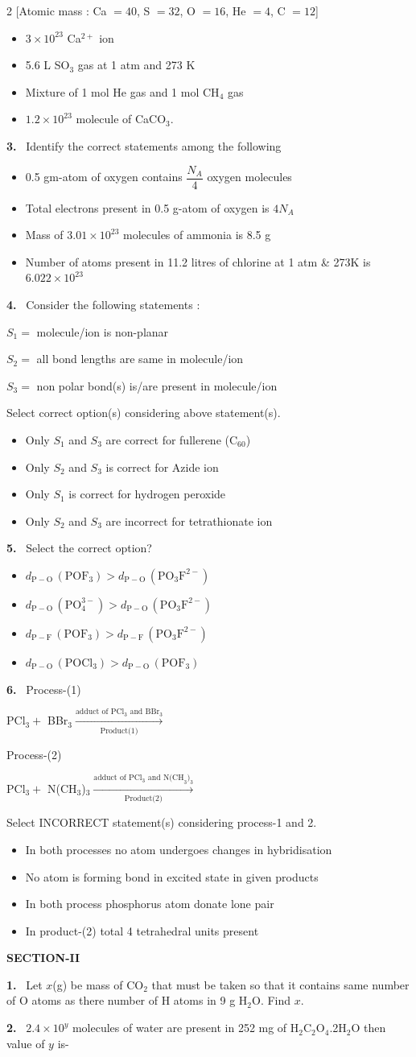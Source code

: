 \documentclass[10pt]{extarticle}
\newcommand{\sect}[1]{\par\smallskip\noindent\textbf{#1}\par}
\newcommand{\qn}[1]{\par\smallskip\noindent\textbf{#1.}~}
\newenvironment{qoptions}{\begin{itemize}[leftmargin=1.8em,itemsep=1pt,topsep=2pt,label={}]}{\end{itemize}}
\newcommand{\opt}[2]{\item[(#1)] #2}
\begin{document}
\begin{multicols}{2}
[Atomic mass : Ca $=40$, S $=32$, O $=16$, He $=4$, C $=12$]
\begin{qoptions}
\opt{A}{$3\times10^{23}$ Ca$^{2+}$ ion}
\opt{B}{5.6 L SO$_3$ gas at 1 atm and 273 K}
\opt{C}{Mixture of 1 mol He gas and 1 mol CH$_4$ gas}
\opt{D}{$1.2\times10^{23}$ molecule of CaCO$_3$.}
\end{qoptions}
\qn{3} Identify the correct statements among the following
\begin{qoptions}
\opt{A}{0.5 gm-atom of oxygen contains $\dfrac{N_A}4$ oxygen molecules}
\opt{B}{Total electrons present in 0.5 g-atom of oxygen is $4N_A$}
\opt{C}{Mass of $3.01\times10^{23}$ molecules of ammonia is 8.5 g}
\opt{D}{Number of atoms present in 11.2 litres of chlorine at 1 atm \& 273K is $6.022\times10^{23}$}
\end{qoptions}
\qn{4} Consider the following statements :

$S_1=$ molecule/ion is non-planar

$S_2=$ all bond lengths are same in molecule/ion

$S_3=$ non polar bond(s) is/are present in molecule/ion

Select correct option(s) considering above statement(s).
\begin{qoptions}
\opt{A}{Only $S_1$ and $S_3$ are correct for fullerene (C$_{60}$)}
\opt{B}{Only $S_2$ and $S_3$ is correct for Azide ion}
\opt{C}{Only $S_1$ is correct for hydrogen peroxide}
\opt{D}{Only $S_2$ and $S_3$ are incorrect for tetrathionate ion}
\end{qoptions}
\qn{5} Select the correct option?
\begin{qoptions}
\opt{A}{$d_{\mathrm{P-O}}\,(\mathrm{POF_3})>d_{\mathrm{P-O}}\,(\mathrm{PO_3F^{2-}})$}
\opt{B}{$d_{\mathrm{P-O}}\,(\mathrm{PO_4^{3-}})>d_{\mathrm{P-O}}\,(\mathrm{PO_3F^{2-}})$}
\opt{C}{$d_{\mathrm{P-F}}\,(\mathrm{POF_3})>d_{\mathrm{P-F}}\,(\mathrm{PO_3F^{2-}})$}
\opt{D}{$d_{\mathrm{P-O}}\,(\mathrm{POCl_3})>d_{\mathrm{P-O}}\,(\mathrm{POF_3})$}
\end{qoptions}
\qn{6} Process-(1)

PCl$_3+$ BBr$_3\xrightarrow[\text{Product(1)}]{\text{adduct of PCl}_3\text{ and BBr}_3}$

Process-(2)

PCl$_3+$ N(CH$_3$)$_3\xrightarrow[\text{Product(2)}]{\text{adduct of PCl}_3\text{ and N(CH}_3)_3}$

Select INCORRECT statement(s) considering process-1 and 2.
\begin{qoptions}
\opt{A}{In both processes no atom undergoes changes in hybridisation}
\opt{B}{No atom is forming bond in excited state in given products}
\opt{C}{In both process phosphorus atom donate lone pair}
\opt{D}{In product-(2) total 4 tetrahedral units present}
\end{qoptions}
\sect{SECTION-II}
\qn{1} Let $x$(g) be mass of CO$_2$ that must be taken so that it contains same number of O atoms as there number of H atoms in 9 g H$_2$O. Find $x$.
\qn{2} $2.4\times10^y$ molecules of water are present in 252 mg of H$_2$C$_2$O$_4$.2H$_2$O then value of $y$ is-


\end{multicols}
\end{document}
